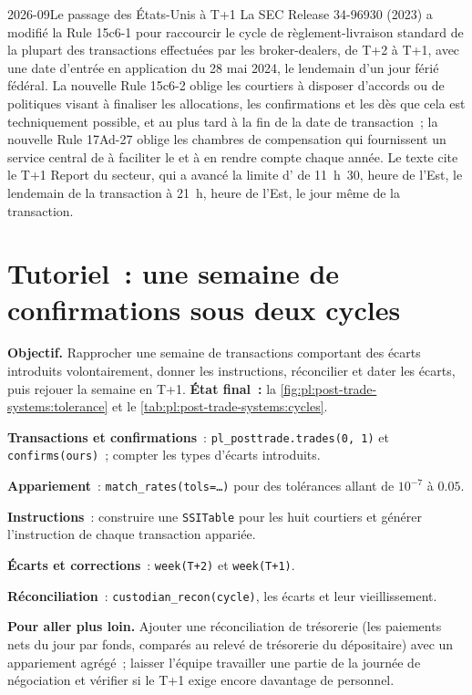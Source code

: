 \begin{dated}{2026-09}{Le passage des États-Unis à T+1}\label{dat:pl:post-trade-systems:t1}
La SEC Release 34-96930 (2023) a modifié la Rule 15c6-1 pour raccourcir le cycle de règlement-livraison standard de la plupart des transactions effectuées par les broker-dealers, de T+2 à T+1,
avec une date d'entrée en application du 28 mai 2024, le lendemain d'un jour férié fédéral. La nouvelle Rule 15c6-2 oblige les courtiers à disposer d'accords ou de politiques visant
à finaliser les allocations, les confirmations et les  dès que cela est techniquement possible, et au plus tard à la fin de la date de transaction~;
la nouvelle Rule 17Ad-27 oblige les chambres de compensation qui fournissent un service central de  à faciliter le  et à en rendre compte
chaque année. Le texte cite le T+1 Report du secteur, qui a avancé la limite d' de 11~h~30, heure de l'Est, le lendemain de la transaction
à 21~h, heure de l'Est, le jour même de la transaction.
\end{dated}

\section{Tutoriel~: une semaine de confirmations sous deux cycles}\label{tut:pl:post-trade-systems:tut}

\begin{tutorial}
\textbf{Objectif.} Rapprocher une semaine de transactions comportant des écarts introduits volontairement, donner les instructions, réconcilier et dater les écarts, puis rejouer la semaine en T+1.
\textbf{État final~:} la \cref{fig:pl:post-trade-systems:tolerance} et le \cref{tab:pl:post-trade-systems:cycles}.
\begin{tutsteps}
\item \textbf{Transactions et confirmations}~: \texttt{pl\_posttrade.trades(0, 1)} et \texttt{confirms(ours)}~; compter les types d'écarts introduits.
\item \textbf{Appariement}~: \texttt{match\_rates(tols=\dots)} pour des tolérances allant de $10^{-7}$ à $0.05$.
\item \textbf{Instructions}~: construire une \texttt{SSITable} pour les huit courtiers et générer l'instruction de chaque transaction appariée.
\item \textbf{Écarts et corrections}~: \texttt{week(\textquotedbl T+2\textquotedbl)} et \texttt{week(\textquotedbl T+1\textquotedbl)}.
\item \textbf{Réconciliation}~: \texttt{custodian\_recon(cycle)}, les écarts et leur vieillissement.
\end{tutsteps}
\textbf{Pour aller plus loin.} Ajouter une réconciliation de trésorerie (les paiements nets du jour par fonds, comparés au relevé de trésorerie du dépositaire) avec
un appariement agrégé~; laisser l'équipe travailler une partie de la journée de négociation et vérifier si le T+1 exige encore davantage de personnel.
\end{tutorial}

